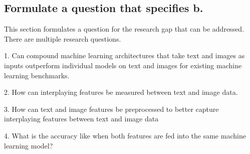 \subsection{Formulate a question that specifies b.}

This section formulates a question for the research gap that can be addressed.  There are multiple research questions.

1. Can compound machine learning architectures that take text and images as inputs outperform individual models on text and images for existing machine learning benchmarks.  

2. How can interplaying features be measured between text and image data.

3. How can text and image features be preprocessed to better capture interplaying features between text and image data

4. What is the accuracy like when both features are fed into the same machine learning model?
